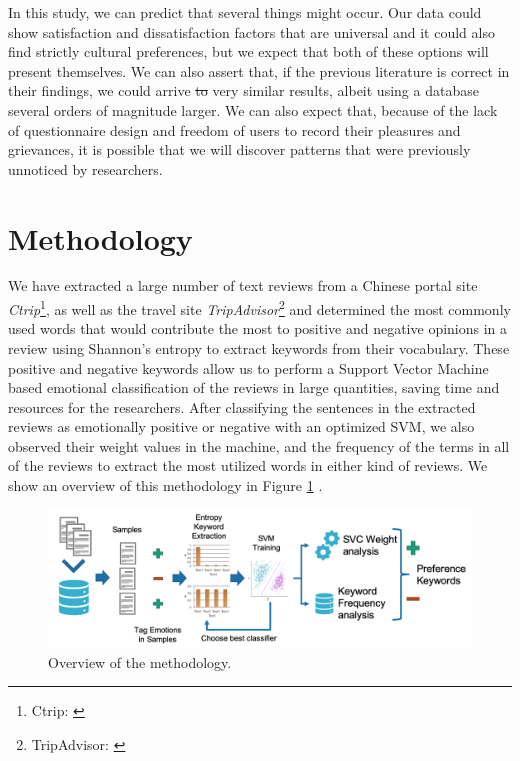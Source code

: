 \documentclass[review]{elsarticle}
\providecommand{\DIFadd}[1]{{\protect\color{blue}\uwave{#1}}} %
\providecommand{\DIFdel}[1]{{\protect\color{red}\sout{#1}}}                      %
\providecommand{\DIFaddbegin}{} %
\providecommand{\DIFaddend}{} %
\providecommand{\DIFdelbegin}{} %
\providecommand{\DIFdelend}{} %
\newcommand{\DIFscaledelfig}{0.5}
\newlength{\DIFdelgraphicswidth} %
\newlength{\DIFdelgraphicsheight} %
\newcommand{\DIFaddincludegraphics}[2][]{{\color{blue}\fbox{\DIFOincludegraphics[#1]{#2}}}} %
\newcommand{\DIFdelincludegraphics}[2][]{%
\sbox{\DIFdelgraphicsbox}{\DIFOincludegraphics[#1]{#2}}%
\settoboxwidth{\DIFdelgraphicswidth}{\DIFdelgraphicsbox} %
\settoboxtotalheight{\DIFdelgraphicsheight}{\DIFdelgraphicsbox} %
\scalebox{\DIFscaledelfig}{%
\parbox[b]{\DIFdelgraphicswidth}{\usebox{\DIFdelgraphicsbox}\\[-\baselineskip] \rule{\DIFdelgraphicswidth}{0em}}\llap{\resizebox{\DIFdelgraphicswidth}{\DIFdelgraphicsheight}{%
\setlength{\unitlength}{\DIFdelgraphicswidth}%
\begin{picture}(1,1)%
\thicklines\linethickness{2pt} %
{\color[rgb]{1,0,0}\put(0,0){\framebox(1,1){}}}%
{\color[rgb]{1,0,0}\put(0,0){\line( 1,1){1}}}%
{\color[rgb]{1,0,0}\put(0,1){\line(1,-1){1}}}%
\end{picture}%
}\hspace*{3pt}}} %
} %
\DeclareRobustCommand{\DIFaddbegin}{\DIFOaddbegin \let\includegraphics\DIFaddincludegraphics} %
\DeclareRobustCommand{\DIFaddend}{\DIFOaddend \let\includegraphics\DIFOincludegraphics} %
\DeclareRobustCommand{\DIFdelbegin}{\DIFOdelbegin \let\includegraphics\DIFdelincludegraphics} %
\DeclareRobustCommand{\DIFdelend}{\DIFOaddend \let\includegraphics\DIFOincludegraphics} %
\begin{document}
In this study, we can predict that several things might occur. Our data could show satisfaction and dissatisfaction factors that are universal and it could also find strictly cultural preferences, but we expect that both of these options will present themselves. We can also assert that, if the previous literature is correct in their findings, we could arrive \DIFdelbegin \DIFdel{to }\DIFdelend \DIFaddbegin \DIFadd{at }\DIFaddend very similar results, albeit using a database several orders of magnitude larger. We can also expect that, because of the lack of questionnaire design and freedom of users to record their pleasures and grievances, it is possible that we will discover patterns that were previously unnoticed by researchers.

\section{Methodology}\label{method}

We have extracted a large number of text reviews from a Chinese portal site \textit{Ctrip}\footnote{\label{ctrip}Ctrip: \href {www.ctrip.com/}{}}, as well as the travel site \textit{TripAdvisor}\footnote{\label{tripadvisor}TripAdvisor: \href {www.tripadvisor.com/}{}} and determined the most commonly used words that would contribute the most to positive and negative opinions in a review using Shannon's entropy to extract keywords from their vocabulary. These positive and negative keywords allow us to perform a Support Vector Machine based emotional classification of the reviews in large quantities, saving time and resources for the researchers. After classifying the sentences in the extracted reviews as emotionally positive or negative with an optimized SVM, we also observed their weight values in the machine, and the frequency of the terms in all of the reviews to extract the most utilized words in either kind of reviews. We show an overview of this methodology in Figure \ref{fig:method-overview} \cite[][]{Aleman2018ICAROB}.

\begin{figure}[bp]
\centering
\includegraphics[width=\textwidth]{emotion-method-overview.png}
\caption{Overview of the methodology.}
\label{fig:method-overview}
\end{figure}
\end{document}
